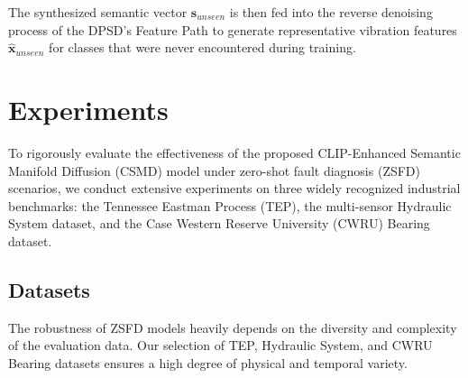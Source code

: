 \documentclass[journal,12pt,onecolumn]{IEEEtran}
\begin{document}
The synthesized semantic vector $\mathbf{s}_{unseen}$ is then fed into the reverse denoising process of the DPSD's Feature Path to generate representative vibration features $\hat{\mathbf{x}}_{unseen}$ for classes that were never encountered during training.




\section{Experiments}
\label{sec:experiments}

To rigorously evaluate the effectiveness of the proposed CLIP-Enhanced Semantic Manifold Diffusion (CSMD) model under zero-shot fault diagnosis (ZSFD) scenarios, we conduct extensive experiments on three widely recognized industrial benchmarks: the Tennessee Eastman Process (TEP), the multi-sensor Hydraulic System dataset, and the Case Western Reserve University (CWRU) Bearing dataset.

\subsection{Datasets}
The robustness of ZSFD models heavily depends on the diversity and complexity of the evaluation data. Our selection of TEP, Hydraulic System, and CWRU Bearing datasets ensures a high degree of physical and temporal variety.
\end{document}
